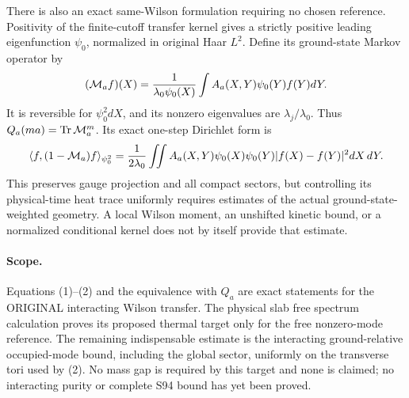 \documentclass{article}
\begin{document}
There is also an exact same-Wilson formulation requiring no chosen reference. Positivity of the finite-cutoff transfer kernel gives a strictly positive leading eigenfunction $\psi_0$, normalized in original Haar $L^2$. Define its ground-state Markov operator by
\[
 ({\cal M}_af)(X)=\frac1{\lambda_0\psi_0(X)}
 \int A_a(X,Y)\psi_0(Y)f(Y)dY.
\]
It is reversible for $\psi_0^2dX$, and its nonzero eigenvalues are $\lambda_j/\lambda_0$. Thus
$Q_a(ma)=\operatorname{Tr}{\cal M}_a^m$. Its exact one-step Dirichlet form is
\[
 \langle f,(1-{\cal M}_a)f\rangle_{\psi_0^2}
 =\frac1{2\lambda_0}\iint A_a(X,Y)\psi_0(X)\psi_0(Y)|f(X)-f(Y)|^2dX\,dY.
\]
This preserves gauge projection and all compact sectors, but controlling its physical-time heat trace uniformly requires estimates of the actual ground-state-weighted geometry. A local Wilson moment, an unshifted kinetic bound, or a normalized conditional kernel does not by itself provide that estimate.

\paragraph{Scope.}
Equations (1)--(2) and the equivalence with $Q_a$ are exact statements for the ORIGINAL interacting Wilson transfer. The physical slab free spectrum calculation proves its proposed thermal target only for the free nonzero-mode reference. The remaining indispensable estimate is the interacting ground-relative occupied-mode bound, including the global sector, uniformly on the transverse tori used by (2). No mass gap is required by this target and none is claimed; no interacting purity or complete S94 bound has yet been proved.
\end{document}
